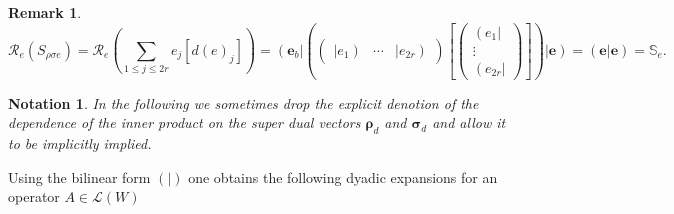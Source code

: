 \documentclass[aps,preprint]{revtex4}
\newtheorem{notation}[theorem]{Notation}
\newtheorem{remark}[theorem]{Remark}
\begin{document}
\begin{remark}
\begin{equation}
\mathcal{R}_{e}\left( S_{\rho \sigma e}\right) =\mathcal{R}_{e}\left(
\sum_{1\leq j\leq 2r}e_{j}\left[ d\left( e\right) _{j}\right] \right)
=\left( \boldsymbol{e}_{b}\right\vert \left( \left( 
\begin{array}{ccc}
\left\vert e_{1}\right) & \cdots & \left\vert e_{2r}\right)%
\end{array}%
\right) \left[ \left( 
\begin{array}{c}
\left( e_{1}\right\vert \\ 
\vdots \\ 
\left( e_{2r}\right\vert%
\end{array}%
\right) \right] \right) \left\vert \boldsymbol{e}\right) =\left( \left. 
\boldsymbol{e}\right\vert \boldsymbol{e}\right) =\mathbb{S}_{e}.
\end{equation}
\end{remark}

\begin{notation}
In the following we sometimes drop the explicit denotion of the dependence
of the inner product on the super dual vectors $\mathbf{\rho }_{d}$ and $%
\mathbf{\sigma }_{d}$ and allow it to be implicitly implied.
\end{notation}

Using the bilinear form $\left( \left. {}\right\vert \right) $ one obtains
the following dyadic expansions for an operator $A\in \mathcal{L}\left(
W\right) $
\end{document}
